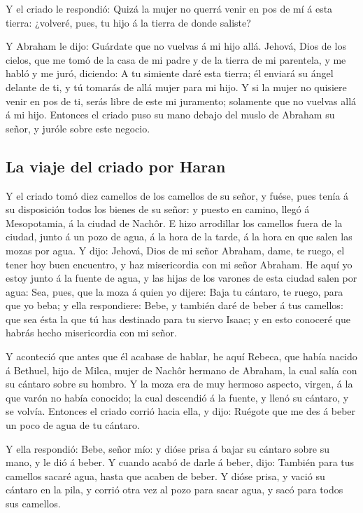  Y el criado le respondió: Quizá la mujer no querrá venir en
pos de mí á esta tierra: ¿volveré, pues, tu hijo á la tierra de donde
saliste?

 Y Abraham le dijo: Guárdate que no vuelvas á mi hijo allá.
 Jehová, Dios de los cielos, que me tomó de la casa de mi
padre y de la tierra de mi parentela, y me habló y me juró, diciendo: A
tu simiente daré esta tierra; él enviará su ángel delante de ti, y tú
tomarás de allá mujer para mi hijo.  Y si la mujer no
quisiere venir en pos de ti, serás libre de este mi juramento; solamente
que no vuelvas allá á mi hijo.  Entonces el criado puso su
mano debajo del muslo de Abraham su señor, y juróle sobre este negocio.

\hypertarget{la-viaje-del-criado-por-haran}{%
\subsection{La viaje del criado por
Haran}\label{la-viaje-del-criado-por-haran}}

 Y el criado tomó diez camellos de los camellos de su
señor, y fuése, pues tenía á su disposición todos los bienes de su
señor: y puesto en camino, llegó á Mesopotamia, á la ciudad de Nachôr.
 E hizo arrodillar los camellos fuera de la ciudad, junto á
un pozo de agua, á la hora de la tarde, á la hora en que salen las mozas
por agua.  Y dijo: Jehová, Dios de mi señor Abraham, dame,
te ruego, el tener hoy buen encuentro, y haz misericordia con mi señor
Abraham.  He aquí yo estoy junto á la fuente de agua, y las
hijas de los varones de esta ciudad salen por agua:  Sea,
pues, que la moza á quien yo dijere: Baja tu cántaro, te ruego, para que
yo beba; y ella respondiere: Bebe, y también daré de beber á tus
camellos: que sea ésta la que tú has destinado para tu siervo Isaac; y
en esto conoceré que habrás hecho misericordia con mi señor.

 Y aconteció que antes que él acabase de hablar, he aquí
Rebeca, que había nacido á Bethuel, hijo de Milca, mujer de Nachôr
hermano de Abraham, la cual salía con su cántaro sobre su hombro.
 Y la moza era de muy hermoso aspecto, virgen, á la que
varón no había conocido; la cual descendió á la fuente, y llenó su
cántaro, y se volvía.  Entonces el criado corrió hacia
ella, y dijo: Ruégote que me des á beber un poco de agua de tu cántaro.

 Y ella respondió: Bebe, señor mío: y dióse prisa á bajar
su cántaro sobre su mano, y le dió á beber.  Y cuando acabó
de darle á beber, dijo: También para tus camellos sacaré agua, hasta que
acaben de beber.  Y dióse prisa, y vació su cántaro en la
pila, y corrió otra vez al pozo para sacar agua, y sacó para todos sus
camellos.

